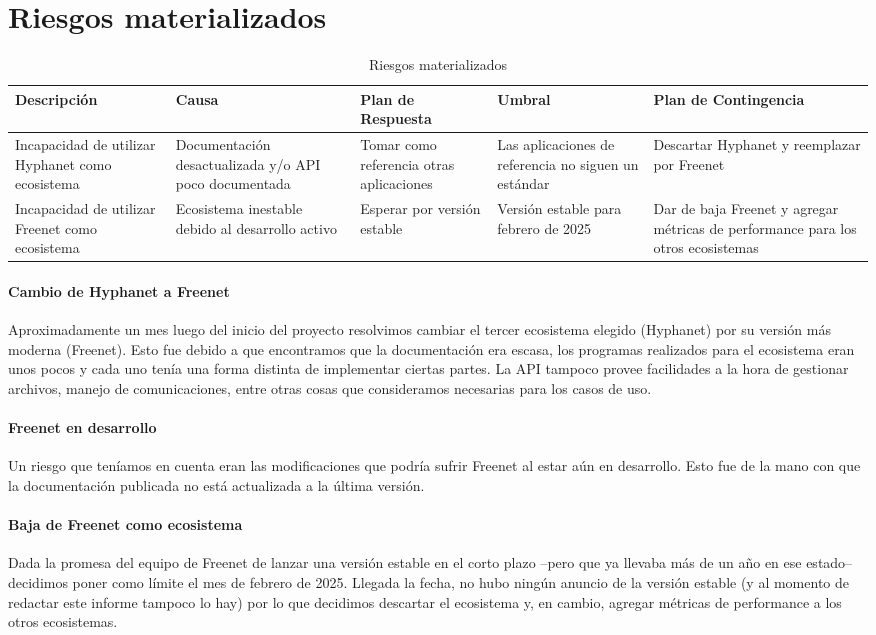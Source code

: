 \section{Riesgos materializados}

\setlength\tabcolsep{3pt}
\begin{table}[H]
    \centering
    \begin{tabular}{*{5}{|p{70pt}}|}
    \hline
    \textbf{Descripción} & \textbf{Causa} & \textbf{Plan \break de \break Respuesta} & \textbf{Umbral} & \textbf{Plan \break de \break Contingencia} \\
    \hline\hline
    Incapacidad de utilizar Hyphanet como ecosistema & Documentación desactualizada y/o API poco documentada & Tomar como \break referencia \break otras \break aplicaciones & Las aplicaciones de referencia no siguen un estándar & Descartar \break Hyphanet y reemplazar por Freenet \\
    \hline
    Incapacidad de utilizar Freenet como ecosistema & Ecosistema \break inestable \break debido al \break desarrollo activo & Esperar por \break versión estable & Versión estable para febrero de 2025 & Dar de baja \break Freenet y agregar métricas de performance para los otros ecosistemas \\
    \hline
    \end{tabular}
    \caption{Riesgos materializados}
\end{table}

\paragraph{Cambio de Hyphanet a Freenet}
Aproximadamente un mes luego del inicio del proyecto resolvimos cambiar el tercer ecosistema elegido (Hyphanet) por su versión más moderna (Freenet). Esto fue debido a que encontramos que la documentación era escasa, los programas realizados para el ecosistema eran unos pocos y cada uno tenía una forma distinta de implementar ciertas partes. La API tampoco provee facilidades a la hora de gestionar archivos, manejo de comunicaciones, entre otras cosas que consideramos necesarias para los casos de uso.

\paragraph{Freenet en desarrollo}
Un riesgo que teníamos en cuenta eran las modificaciones que podría sufrir Freenet al estar aún en desarrollo. Esto fue de la mano con que la documentación publicada no está actualizada a la última versión.

\paragraph{Baja de Freenet como ecosistema}
Dada la promesa del equipo de Freenet de lanzar una versión estable en el corto plazo --pero que ya llevaba más de un año en ese estado-- decidimos poner como límite el mes de febrero de 2025. Llegada la fecha, no hubo ningún anuncio de la versión estable (y al momento de redactar este informe tampoco lo hay) por lo que decidimos descartar el ecosistema y, en cambio, agregar métricas de performance a los otros ecosistemas.